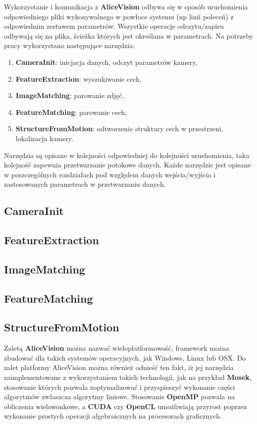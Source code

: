 Wykorzystanie i komunikacja z \textbf{AliceVision} odbywa się w sposób uruchomienia odpowiedniego pliki wykonywalnego w powłoce systemu (np linii poleceń) z odpowiednim zestawem parametrów.
Wszystkie operacje odczytu/zapisu odbywają się na plika, ścieżka których jest określana w parametrach.
Na potrzeby pracy wykorzystano następujące narzędzia:

\begin{enumerate}
   \item \textbf{CameraInit}: inicjacja danych, odczyt parametrów kamery,
   \item \textbf{FeatureExtraction}: wyszukiwanie cech,
   \item \textbf{ImageMatching}: parowanie zdjęć,
   \item \textbf{FeatureMatching}: parowanie cech,
   \item \textbf{StructureFromMotion}: odtworzenie struktury cech w przestrzeni, lokalizacja kamery.
\end{enumerate}

Narzędzia są opisane w kolejności odpowiedniej do kolejności uruchomienia, taka kolejność zapewnia przetwarzanie potokowe danych.
Każde narzędzie jest opisane w poszczególnych rozdziałach pod względem danych wejścia/wyjścia i zastosowanych parametrach w przetwarzaniu danych.

\subsection{CameraInit}
\subsection{FeatureExtraction}
\subsection{ImageMatching}
\subsection{FeatureMatching}
\subsection{StructureFromMotion}

Zaletą \textbf{AliceVision} można nazwać wieloplatformowość, framework można zbudować dla takich systemów operacyjnych, jak Windows, Linux lub OSX.
Do zalet platformy AliceVision można również odnieść ten fakt, iż jej narzędzia zaimplementowane z wykorzystaniem takich technologii, jak na przykład \textbf{Mosek}, stosowanie których pozwala zoptymalizować i przyspieszyć wykonanie części algorytmów zwłaszcza algorytmy liniowe.
Stosowanie \textbf{OpenMP} pozwala na obliczenia wielowonkowe, a \textbf{CUDA} czy \textbf{OpenCL} umożliwiają przyrost poprzez wykonanie prostych operacji algebraicznych na procesorach graficznych.

